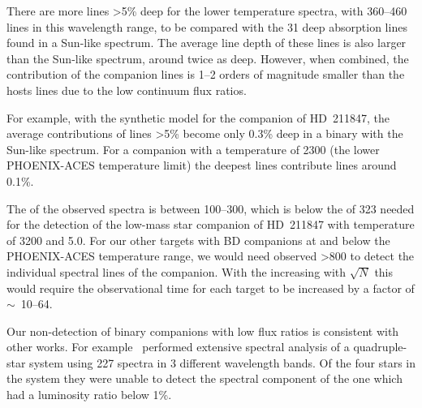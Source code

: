 There are more lines >5\% deep for the lower temperature spectra, with 360--460 lines in this wavelength range, to be compared with the 31 deep absorption lines found in a Sun-like spectrum.
The average line depth of these lines is also larger than the Sun-like spectrum, around twice as deep.
However, when combined, the contribution of the companion lines is 1--2 orders of magnitude smaller than the hosts lines due to the low continuum flux ratios.

For example, with the synthetic model for the companion of {HD~211847}, the average contributions of lines >5\% become only 0.3\% deep in a binary with the Sun-like spectrum.
For a companion with a temperature of 2300\K{} (the lower {PHOENIX-ACES} temperature limit) the deepest lines contribute lines around 0.1\%.


The \snr{} of the observed spectra is between 100--300, which is below the \snr{} of 323 needed for the detection of the low-mass star companion of {HD~211847} with temperature of 3200\K{} and \logg{} 5.0.
For our other targets with {BD} companions at and below the {PHOENIX-ACES} temperature range, we would need observed \snr{} >800 to detect the individual spectral lines of the companion.
With the \snr{} increasing with \(\sqrt{N}\) this would require the observational time for each target to be increased by a factor of \(\sim\)~10--64.

Our non-detection of binary companions with low flux ratios is consistent with other works.
For example~\citet{nemravova_xtauri_2016} performed extensive spectral analysis of a quadruple-star system  using 227 spectra in 3 different wavelength bands.
Of the four stars in the system they were unable to detect the spectral component of the one which had a luminosity ratio below 1\%.

